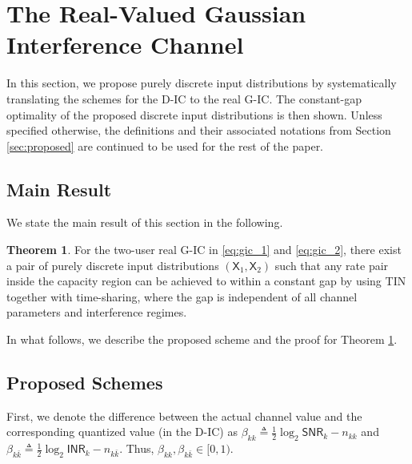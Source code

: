 \documentclass[12pt, draftclsnofoot, onecolumn]{IEEEtran}
\newcommand{\msf}[1]{\mathsf{#1}}
\newcommand{\SNR}{\msf{SNR}}
\newcommand{\INR}{\msf{INR}}
\theoremstyle{definition}
\newtheorem{theorem}{Theorem}
\begin{document}
\section{The Real-Valued Gaussian Interference Channel}\label{sec:RGIC}
In this section, we propose purely discrete input distributions by systematically translating the schemes for the D-IC to the real G-IC. The constant-gap optimality of the proposed discrete input distributions is then shown. Unless specified otherwise, the definitions and their associated notations from Section \ref{sec:proposed} are continued to be used for the rest of the paper.


\subsection{Main Result}
We state the main result of this section in the following.
\begin{theorem}\label{the:main1}
For the two-user real G-IC in \eqref{eq:gic_1} and \eqref{eq:gic_2}, there exist a pair of purely discrete input distributions $(\msf{X}_1,\msf{X}_2)$ such that any rate pair inside the capacity region can be achieved to within a constant gap by using TIN together with time-sharing, where the gap is independent of all channel parameters and interference regimes.
\end{theorem}

In what follows, we describe the proposed scheme and the proof for Theorem \ref{the:main1}.

\subsection{Proposed Schemes}
First, we denote the difference between the actual channel value and the corresponding quantized value (in the D-IC) as $\beta_{kk} \triangleq \frac{1}{2}\log_2\SNR_k-n_{kk}$ and $\beta_{k\bar{k}} \triangleq \frac{1}{2}\log_2\INR_{k}-n_{k\bar{k}}$. Thus, $\beta_{kk},\beta_{k\bar{k}} \in [0,1)$.
\end{document}
